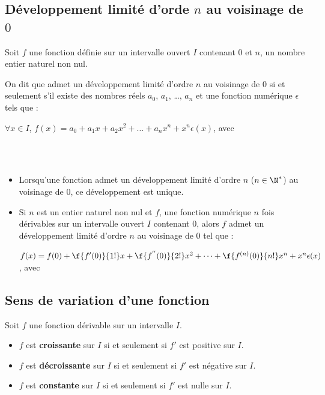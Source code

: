 \subsection{Développement limité d'orde $n$ au voisinage de $0$}
\begin{definition}
Soit $f$ une fonction définie sur un intervalle ouvert $I$
contenant $0$ et $n$, un nombre entier naturel non nul.
\par On dit que admet un développement limité d’ordre $n$ au voisinage de $0$ si et seulement s'il existe des nombres réels $a_0$, $a_1$, \dots, $a_n$ et une fonction numérique $\epsilon$ tels que : 
\par $\forall x\in I$, $f(x)=a_0+a_1x+a_2x^2+\dots+a_nx^n+x^n\epsilon (x)$, avec 
\end{definition}\\\\
\begin{propriete}[s]
	\begin{itemize}
	\item Lorsqu'une fonction admet un développement limité d'ordre $n$ ($n\in \N^*$) au voisinage de $0$, ce développement est unique.
	\item Si $n$ est un entier naturel non nul et $f$, une fonction numérique $n$ fois dérivables sur un intervalle ouvert $I$ contenant $0$, alors $f$ admet un développement limité d'ordre $n$ au voisinage de $0$ tel que :
	\par $f(x)= f(0)+\f{f'(0)}{1!}x+\f{f^{''}(0)}{2!}x^2+\dots+\f{f^{(n)}(0)}{n!}x^n+x^n\epsilon (x)$, avec 
	\end{itemize}
\end{propriete}
\subsection{Sens de variation d'une fonction}
\begin{propriete}[s]
Soit $f$ une fonction dérivable sur un intervalle $I$.
\begin{itemize}
	\item $f$ est \textbf{croissante} sur $I$ si et seulement si $f'$ est positive sur $I$.
	\item $f$ est \textbf{décroissante} sur $I$ si et seulement si $f'$ est négative sur $I$.
	\item $f$ est \textbf{constante} sur $I$ si et seulement si $f'$ est nulle sur $I$.
\end{itemize}
\end{propriete}
